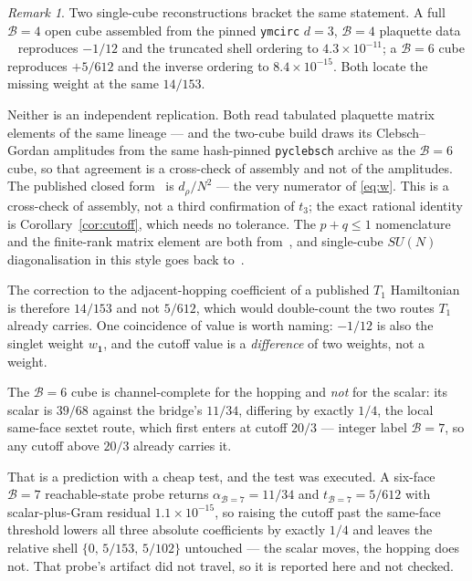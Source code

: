 \documentclass[11pt]{article}
\theoremstyle{plain}
\theoremstyle{definition}
\theoremstyle{remark}
\newtheorem{remark}[theorem]{Remark}
\newcommand{\chk}[1]{}
\begin{document}
\begin{remark}
Two single-cube reconstructions bracket the same statement. A full $\mathcal B=4$ open
cube assembled from the pinned \texttt{ymcirc} $d=3$, $\mathcal B=4$ plaquette data
~\cite{Balaji2026,ymcirc2026} reproduces $-1/12$ and the truncated shell ordering to
$4.3\times10^{-11}$; a $\mathcal B=6$ cube reproduces $+5/612$ and the inverse ordering
to $8.4\times10^{-15}$. Both locate the missing weight at the same $14/153$.

Neither is an independent replication. Both read tabulated plaquette matrix
elements of the same lineage --- and the two-cube build draws its
Clebsch--Gordan amplitudes from the same hash-pinned \texttt{pyclebsch} archive
as the $\mathcal B=6$ cube, so that agreement is a cross-check of assembly and not of
the amplitudes. The published closed form~\cite{CBB2025} is
$d_\rho/N^2$ --- the very numerator of \eqref{eq:w}. This is a cross-check of
assembly, not a third confirmation of $t_3$; the exact rational identity is
Corollary~\ref{cor:cutoff}, which needs no tolerance. The $p+q\le1$
nomenclature and the finite-rank matrix element are both from~\cite{CBB2025},
and single-cube $SU(N)$ diagonalisation in this style goes back
to~\cite{CM2003}.

The correction to the adjacent-hopping coefficient of a published $T_1$
Hamiltonian is therefore $14/153$ and not $5/612$, which would double-count
the two routes $T_1$ already carries. One coincidence of value is worth naming:
$-1/12$ is also the singlet weight $w_{\mathbf 1}$, and the cutoff value is a
\emph{difference} of two weights, not a weight.
\chk{FINDING: a full T1 = B = 4 cube Hamiltonian reproduces -1/12 and the reversed shell}
\chk{FINDING: the B = 6 cube flips the sign back to +5/612, closing the decisive test}
\end{remark}

The $\mathcal B=6$ cube is channel-complete for the hopping and \emph{not} for the
scalar: its scalar is $39/68$ against the bridge's $11/34$, differing by
exactly $1/4$, the local same-face sextet route, which first enters at cutoff
$20/3$ --- integer label $\mathcal B=7$, so any cutoff above $20/3$ already carries it.
\chk{the B = 6 scalar misses the bridge's by exactly the same-face sextet route}

That is a prediction with a cheap test, and the test was executed. A six-face
$\mathcal B=7$ reachable-state probe returns $\alpha_{\mathcal B=7}=11/34$ and
$t_{\mathcal B=7}=5/612$ with scalar-plus-Gram residual $1.1\times10^{-15}$, so
raising the cutoff past the same-face threshold lowers all three absolute
coefficients by exactly $1/4$ and leaves the relative shell
$\{0,\,5/153,\,5/102\}$ untouched --- the scalar moves, the hopping does not.
That probe's artifact did not travel, so it is reported here and not checked.
\end{document}

